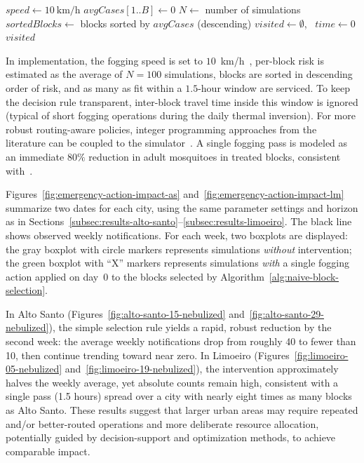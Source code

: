 \begin{algorithm}[h!]
\caption{Basic Block Selection Procedure}\label{alg:naive-block-selection}
\BlankLine
$speed \gets 10\ \text{km/h}$\; 
$avgCases[1..B] \gets 0$\; 
$N \gets$ number of simulations\;
$sortedBlocks \gets$ blocks sorted by $avgCases$ (descending)\;
$visited \gets \emptyset$, \ $time \gets 0$\;
\Return $visited$
\end{algorithm}

In implementation, the fogging speed is set to $10$~km/h~\cite{brasil-dept-helth:2009}, per-block risk is estimated as the average of $N\!=\!100$ simulations, blocks are sorted in descending order of risk, and as many as fit within a $1.5$-hour window are serviced. To keep the decision rule transparent, inter-block travel time inside this window is ignored (typical of short fogging operations during the daily thermal inversion). For more robust routing-aware policies, integer programming approaches from the literature can be coupled to the simulator~\cite{araujo:2022,andrade:2021}. A single fogging pass is modeled as an immediate $80\%$ reduction in adult mosquitoes in treated blocks, consistent with~\cite{brasil-dept-helth:2009}.

Figures~\ref{fig:emergency-action-impact-as} and~\ref{fig:emergency-action-impact-lm} summarize two dates for each city, using the same parameter settings and horizon as in Sections~\ref{subsec:results-alto-santo}–\ref{subsec:results-limoeiro}. The black line shows observed weekly notifications. For each week, two boxplots are displayed: the gray boxplot with circle markers represents simulations \emph{without} intervention; the green boxplot with “X” markers represents simulations \emph{with} a single fogging action applied on day~0 to the blocks selected by Algorithm~\ref{alg:naive-block-selection}.

In Alto Santo (Figures~\ref{fig:alto-santo-15-nebulized} and~\ref{fig:alto-santo-29-nebulized}), the simple selection rule yields a rapid, robust reduction by the second week: the average weekly notifications drop from roughly 40 to fewer than 10, then continue trending toward near zero. In Limoeiro (Figures~\ref{fig:limoeiro-05-nebulized} and~\ref{fig:limoeiro-19-nebulized}), the intervention approximately halves the weekly average, yet absolute counts remain high, consistent with a single pass (1.5 hours) spread over a city with nearly eight times as many blocks as Alto Santo. These results suggest that larger urban areas may require repeated and/or better-routed operations and more deliberate resource allocation, potentially guided by decision-support and optimization methods, to achieve comparable impact.

